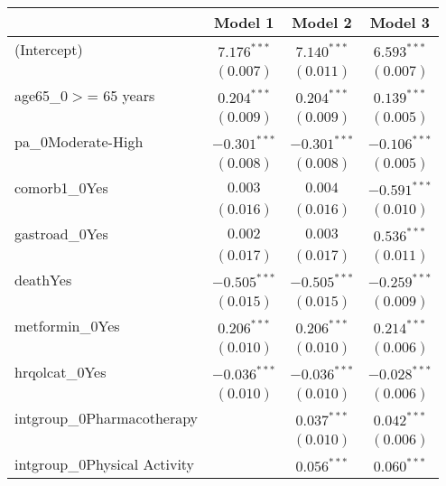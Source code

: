 
\begin{table}
\begin{center}
\begin{tabular}{l c c c }
\hline
 & Model 1 & Model 2 & Model 3 \\
\hline
(Intercept)                  & $7.176^{***}$  & $7.140^{***}$  & $6.593^{***}$  \\
                             & $(0.007)$      & $(0.011)$      & $(0.007)$      \\
age65\_0$>$= 65 years        & $0.204^{***}$  & $0.204^{***}$  & $0.139^{***}$  \\
                             & $(0.009)$      & $(0.009)$      & $(0.005)$      \\
pa\_0Moderate-High           & $-0.301^{***}$ & $-0.301^{***}$ & $-0.106^{***}$ \\
                             & $(0.008)$      & $(0.008)$      & $(0.005)$      \\
comorb1\_0Yes                & $0.003$        & $0.004$        & $-0.591^{***}$ \\
                             & $(0.016)$      & $(0.016)$      & $(0.010)$      \\
gastroad\_0Yes               & $0.002$        & $0.003$        & $0.536^{***}$  \\
                             & $(0.017)$      & $(0.017)$      & $(0.011)$      \\
deathYes                     & $-0.505^{***}$ & $-0.505^{***}$ & $-0.259^{***}$ \\
                             & $(0.015)$      & $(0.015)$      & $(0.009)$      \\
metformin\_0Yes              & $0.206^{***}$  & $0.206^{***}$  & $0.214^{***}$  \\
                             & $(0.010)$      & $(0.010)$      & $(0.006)$      \\
hrqolcat\_0Yes               & $-0.036^{***}$ & $-0.036^{***}$ & $-0.028^{***}$ \\
                             & $(0.010)$      & $(0.010)$      & $(0.006)$      \\
intgroup\_0Pharmacotherapy   &                & $0.037^{***}$  & $0.042^{***}$  \\
                             &                & $(0.010)$      & $(0.006)$      \\
intgroup\_0Physical Activity &                & $0.056^{***}$  & $0.060^{***}$  \\

\end{tabular}
\end{center}
\end{table}
